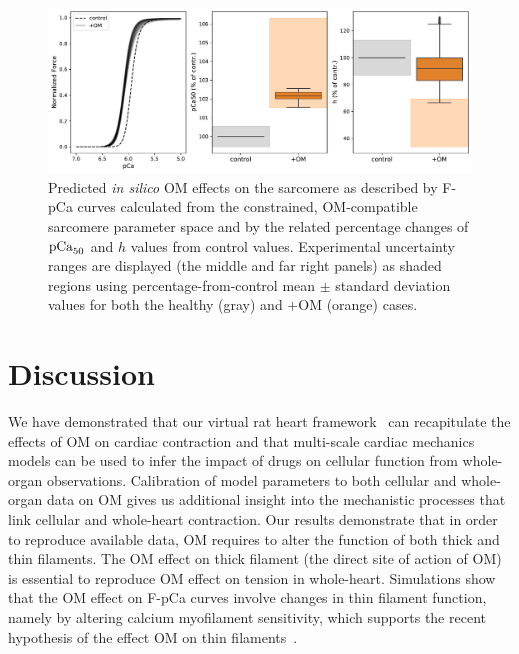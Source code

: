 \begin{figure}[!ht]
    \myfloatalign
    \includegraphics[width=\textwidth]{figures/chapter05/Fig2.pdf}
    \caption{Predicted \textit{in silico} OM effects on the sarcomere as described by F-pCa curves calculated from the constrained, OM-compatible sarcomere parameter space and by the related percentage changes of $\textrm{pCa}_{50}$ and $h$ values from control values. Experimental uncertainty ranges are displayed (the middle and far right panels) as shaded regions using percentage-from-control mean $\pm$ standard deviation values for both the healthy (gray) and $+$OM (orange) cases.}
    \label{fig:wave0mappingtofpCa}
\end{figure}


%
%
%
\newpage
\section{Discussion}\label{sec:ch5discussion}

\noindent
We have demonstrated that our virtual rat heart framework~\cite{Longobardi:2020} can recapitulate the effects of OM on cardiac contraction and that multi-scale cardiac mechanics models can be used to infer the impact of drugs on cellular function from whole-organ observations. Calibration of model parameters to both cellular and whole-organ data on OM gives us additional insight into the mechanistic processes that link cellular and whole-heart contraction. Our results demonstrate that in order to reproduce available data, OM requires to alter the function of both thick and thin filaments. The OM effect on thick filament (the direct site of action of OM) is essential to reproduce OM effect on tension in whole-heart. Simulations show that the OM effect on F-pCa curves involve changes in thin filament function, namely by altering calcium myofilament sensitivity, which supports the recent hypothesis of the effect OM on thin filaments~\cite{Swenson:2017}.

